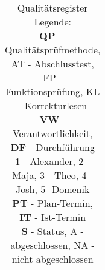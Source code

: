 \begin{table}[H]
\begin{tabular}{|c|l|l|c|l|l|c|c|l|l|l|}
        \hline
    \end{tabular}
    \caption{Qualitätsregister \\ Legende: \\
    \textbf{QP} = Qualitätsprüfmethode, \\
    AT - Abschlusstest, FP - Funktionsprüfung, KL - Korrekturlesen \\
    \textbf{VW} - Verantwortlichkeit, \textbf{DF} - Durchführung\\
    1 - Alexander, 2 - Maja, 3 - Theo, 4 - Josh, 5- Domenik \\
    \textbf{PT} - Plan-Termin, \textbf{IT} - Ist-Termin\\
    \textbf{S} - Status, A - abgeschlossen, NA - nicht abgeschlossen \\}
\end{table}

